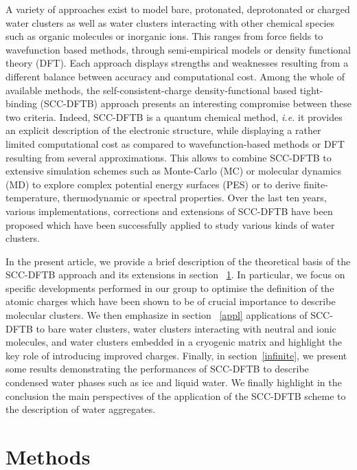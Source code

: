 \documentclass[]{interact}
\theoremstyle{plain}%
\theoremstyle{definition}
\theoremstyle{remark}
\begin{document}
A variety of approaches exist to model bare, protonated, deprotonated or charged water clusters as well as water clusters
interacting with other chemical species such as organic molecules or inorganic ions. This ranges from force fields \cite{Cisneros2016} 
to wavefunction based methods, through semi-empirical models or density functional theory (DFT). Each approach
displays strengths and weaknesses resulting from a different balance between accuracy and computational cost.
Among the whole of available methods, the self-consistent-charge density-functional based tight-binding (SCC-DFTB)
approach presents an interesting compromise between these two criteria. 
Indeed, SCC-DFTB is a quantum chemical method, \textit{i.e.} it provides an explicit description of the electronic structure,
while displaying a rather limited computational cost as compared to wavefunction-based methods or DFT resulting
from several approximations. This allows to combine SCC-DFTB to extensive simulation schemes such as Monte-Carlo (MC)
or molecular dynamics (MD) to explore complex potential energy surfaces (PES) or to derive finite-temperature,
thermodynamic or spectral properties. Over the last ten years, various implementations, corrections and extensions
of SCC-DFTB have been proposed which have been successfully applied to study various kinds of water clusters.

In the present article, we provide a brief description of the theoretical basis of the SCC-DFTB approach and its extensions
in section ~\ref{method}. In particular, we focus on specific developments performed in our group to optimise the definition
of the atomic charges which have been shown to be of crucial importance to describe molecular clusters. We then emphasize
in section ~\ref{appl} applications of SCC-DFTB to bare water clusters, water clusters interacting  with neutral and ionic
molecules, and water clusters embedded in a cryogenic matrix and highlight the key role of introducing  improved charges. 
Finally, in section~\ref{infinite}, we present some results demonstrating the performances of SCC-DFTB to describe condensed
water phases such as ice and liquid water. We finally highlight in the conclusion the main perspectives of the application of
the SCC-DFTB scheme to the description of water aggregates.

\section{Methods} \label{method}
\end{document}
